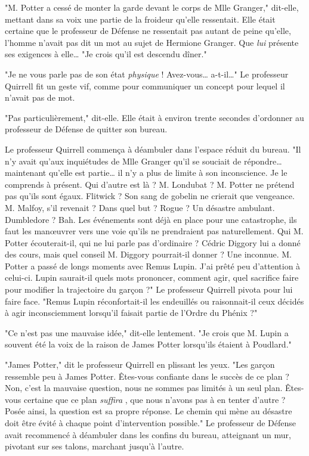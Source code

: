 "M. Potter a cessé de monter la garde devant le corps de Mlle Granger," dit-elle, mettant dans sa voix une partie de la froideur qu'elle ressentait. Elle était certaine que le professeur de Défense ne ressentait pas autant de peine qu'elle, l'homme n'avait pas dit un mot au sujet de Hermione Granger. Que \emph{lui}  présente ses exigences à elle… "Je crois qu'il est descendu dîner."

"Je ne vous parle pas de son état \emph{physique}  ! Avez-vous… a-t-il…" Le professeur Quirrell fit un geste vif, comme pour communiquer un concept pour lequel il n'avait pas de mot.

"Pas particulièrement," dit-elle. Elle était à environ trente secondes d'ordonner au professeur de Défense de quitter son bureau.

Le professeur Quirrell commença à déambuler dans l'espace réduit du bureau. "Il n'y avait qu'aux inquiétudes de Mlle Granger qu'il se souciait de répondre… maintenant qu'elle est partie… il n'y a plus de limite à son inconscience. Je le comprends à présent. Qui d'autre est là ? M. Londubat ? M. Potter ne prétend pas qu'ils sont égaux. Flitwick ? Son sang de gobelin ne crierait que vengeance. M. Malfoy, s'il revenait ? Dans quel but ? Rogue ? Un désastre ambulant. Dumbledore ? Bah. Les événements sont déjà en place pour une catastrophe, ils faut les manœuvrer vers une voie qu'ils ne prendraient pas naturellement. Qui M. Potter écouterait-il, qui ne lui parle pas d'ordinaire ? Cédric Diggory lui a donné des cours, mais quel conseil M. Diggory pourrait-il donner ? Une inconnue. M. Potter a passé de longs moments avec Remus Lupin. J'ai prêté peu d'attention à celui-ci. Lupin saurait-il quels mots prononcer, comment agir, quel sacrifice faire pour modifier la trajectoire du garçon ?" Le professeur Quirrell pivota pour lui faire face. "Remus Lupin réconfortait-il les endeuillés ou raisonnait-il ceux décidés à agir inconsciemment lorsqu'il faisait partie de l'Ordre du Phénix ?"

"Ce n'est pas une mauvaise idée," dit-elle lentement. "Je crois que M. Lupin a souvent été la voix de la raison de James Potter lorsqu'ils étaient à Poudlard."

"James Potter," dit le professeur Quirrell en plissant les yeux. "Les garçon ressemble peu à James Potter. Êtes-vous confiante dans le succès de ce plan ? Non, c'est la mauvaise question, nous ne sommes pas limités à un seul plan. Êtes-vous certaine que ce plan \emph{suffira} , que nous n'avons pas à en tenter d'autre ? Posée ainsi, la question est sa propre réponse. Le chemin qui mène au désastre doit être évité à chaque point d'intervention possible." Le professeur de Défense avait recommencé à déambuler dans les confins du bureau, atteignant un mur, pivotant sur ses talons, marchant jusqu'à l'autre.

